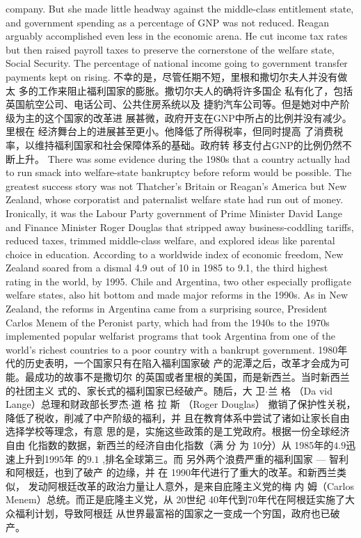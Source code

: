 \begin{paracol}{2}
company. But she made little headway against the middle-class
entitlement state, and government spending as a percentage of
GNP was not reduced. Reagan arguably accomplished even less
in the economic arena. He cut income tax rates but then raised
payroll taxes to preserve the cornerstone of the welfare state,
Social Security. The percentage of national income going to
government transfer payments kept on rising.
\switchcolumn
不幸的是，尽管任期不短，里根和撒切尔夫人并没有做太
多的工作来阻止福利国家的膨胀。撒切尔夫人的确将许多国企
私有化了，包括英国航空公司、电话公司、公共住房系统以及
捷豹汽车公司等。但是她对中产阶级为主的这个国家的改革进
展甚微，政府开支在GNP中所占的比例并没有减少。里根在
经济舞台上的进展甚至更小。他降低了所得税率，但同时提高
了消费税率，以维持福利国家和社会保障体系的基础。政府转
移支付占GNP的比例仍然不断上升。
\switchcolumn*
There was some evidence during the 1980s that a country
actually had to run smack into welfare-state bankruptcy before
reform would be possible. The greatest success story was not
Thatcher's Britain or Reagan's America but New Zealand,
whose corporatist and paternalist welfare state had run out of
money. Ironically, it was the Labour Party government of Prime
Minister David Lange and Finance Minister Roger Douglas
that stripped away business-coddling tariffs, reduced taxes,
trimmed middle-class welfare, and explored ideas like parental
choice in education. According to a worldwide index of economic freedom, New Zealand soared from a dismal 4.9 out of
10 in 1985 to 9.1, the third highest rating in the world, by
1995. Chile and Argentina, two other especially profligate welfare states, also hit bottom and made major reforms in the
1990s. As in New Zealand, the reforms in Argentina came
from a surprising source, President Carlos Menem of the Peronist party, which had from the 1940s to the 1970s implemented popular welfarist programs that took Argentina from
one of the world's richest countries to a poor country with a
bankrupt government.
\switchcolumn
1980年代的历史表明，一个国家只有在陷入福利国家破
产的泥潭之后，改革才会成为可能。最成功的故事不是撒切尔
的英国或者里根的美国，而是新西兰。当时新西兰的社团主义
式的、家长式的福利国家已经破产。随后，大 卫$\cdot$兰 格 （Da­
vid Lange）总理和财政部长罗杰$\cdot$道 格 拉 斯 （Roger Douglas）
撤销了保护性关税，降低了税收，削减了中产阶级的福利，并
且在教育体系中尝试了诸如让家长自由选择学校等理念，有意
思的是，实施这些政策的是工党政府。根据一份全球经济自由
化指数的数据，新西兰的经济自由化指数（满 分 为 10分）从
1985年的$4.9$迅速上升到1995年 的$9.1$ ,排名全球第三。而
另外两个浪费严重的福利国家 --- 智利和阿根廷，也到了破产
的边缘，并 在 1990年代进行了重大的改革。和新西兰类似，
发动阿根廷改革的政治力量让人意外，是来自庇隆主义党的梅
内 姆（Carlos Menem）总统。而正是庇隆主义党，从 20世纪
40年代到70年代在阿根廷实施了大众福利计划，导致阿根廷
从世界最富裕的国家之一变成一个穷国，政府也已破产。




\end{paracol}
